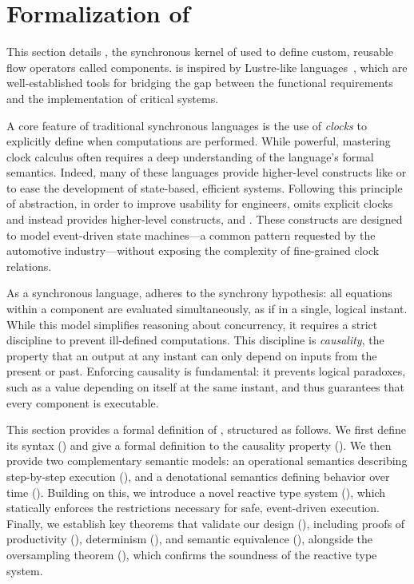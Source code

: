 \section{Formalization of \GRSync}
\label{sec:semantics:grsync}

This section details \GRSync, the synchronous kernel of \GRust used to define custom, reusable flow
operators called components. \GRSync is inspired by Lustre-like languages~\cite{%
    DBLP:conf/tase/ColacoPP17,%
    DBLP:conf/hybrid/BourkeP13,%
    DBLP:conf/emsoft/CohenGP12%
}, which are well-established tools for bridging the gap between the functional requirements and the
implementation of critical systems.

A core feature of traditional synchronous languages is the use of \emph{clocks} to explicitly define
when computations are performed. While powerful, mastering clock calculus often requires a deep
understanding of the language's formal semantics. Indeed, many of these languages provide
higher-level constructs like  or  to ease the development of state-based,
efficient systems.
%
Following this principle of abstraction, in order to improve usability for engineers, \GRSync omits
explicit clocks and instead provides higher-level constructs,  and . These
constructs are designed to model event-driven state machines---a common pattern requested by the
automotive industry---without exposing the complexity of fine-grained clock relations.

As a synchronous language, \GRSync adheres to the synchrony hypothesis: all equations within a
component are evaluated simultaneously, as if in a single, logical instant. While this model
simplifies reasoning about concurrency, it requires a strict discipline to prevent ill-defined
computations. This discipline is \emph{causality}, the property that an output at any instant can
only depend on inputs from the present or past. Enforcing causality is fundamental: it prevents
logical paradoxes, such as a value depending on itself at the same instant, and thus guarantees that
every component is executable.

This section provides a formal definition of \GRSync, structured as follows. We first define its
syntax () and give a formal definition to the causality property
(). We then provide two complementary semantic models: an
operational semantics describing step-by-step execution (), and a
denotational semantics defining behavior over time (). Building on
this, we introduce a novel reactive type system (), which
statically enforces the restrictions necessary for safe, event-driven execution. Finally, we
establish key theorems that validate our design (), including
proofs of productivity (), determinism
(), and semantic equivalence
(), alongside the oversampling theorem
(), which confirms the soundness of the reactive
type system.

